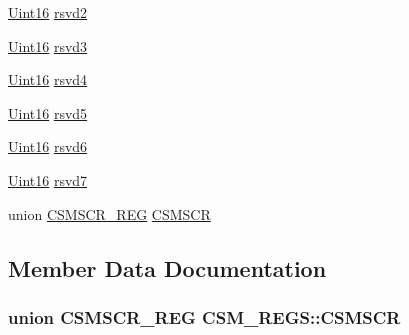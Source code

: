\begin{DoxyCompactItemize}
\item 
\hyperlink{_d_s_p2833x___device_8h_a59a9f6be4562c327cbfb4f7e8e18f08b}{Uint16} \hyperlink{struct_c_s_m___r_e_g_s_a8764b38dd3d522f0e91381302958eb78}{rsvd2}
\item 
\hyperlink{_d_s_p2833x___device_8h_a59a9f6be4562c327cbfb4f7e8e18f08b}{Uint16} \hyperlink{struct_c_s_m___r_e_g_s_a99e02d181935057376511671542dd61c}{rsvd3}
\item 
\hyperlink{_d_s_p2833x___device_8h_a59a9f6be4562c327cbfb4f7e8e18f08b}{Uint16} \hyperlink{struct_c_s_m___r_e_g_s_aae4e714538d044e01433943510615c54}{rsvd4}
\item 
\hyperlink{_d_s_p2833x___device_8h_a59a9f6be4562c327cbfb4f7e8e18f08b}{Uint16} \hyperlink{struct_c_s_m___r_e_g_s_adb1133c4a93f1b9e2dceda2b3dcf83a5}{rsvd5}
\item 
\hyperlink{_d_s_p2833x___device_8h_a59a9f6be4562c327cbfb4f7e8e18f08b}{Uint16} \hyperlink{struct_c_s_m___r_e_g_s_ae58303f1818d0833e2050b37be5f84f8}{rsvd6}
\item 
\hyperlink{_d_s_p2833x___device_8h_a59a9f6be4562c327cbfb4f7e8e18f08b}{Uint16} \hyperlink{struct_c_s_m___r_e_g_s_a2aa082d9f598ea9e0a93de9af6498c06}{rsvd7}
\item 
union \hyperlink{union_c_s_m_s_c_r___r_e_g}{C\+S\+M\+S\+C\+R\+\_\+\+R\+E\+G} \hyperlink{struct_c_s_m___r_e_g_s_ac8f9409f438f898359135dcec87670f8}{C\+S\+M\+S\+C\+R}
\end{DoxyCompactItemize}


\subsection{Member Data Documentation}
\hypertarget{struct_c_s_m___r_e_g_s_ac8f9409f438f898359135dcec87670f8}{}
\subsubsection[{C\+S\+M\+S\+C\+R}]{\setlength{\rightskip}{0pt plus 5cm}union {\bf C\+S\+M\+S\+C\+R\+\_\+\+R\+E\+G} C\+S\+M\+\_\+\+R\+E\+G\+S\+::\+C\+S\+M\+S\+C\+R}\label{struct_c_s_m___r_e_g_s_ac8f9409f438f898359135dcec87670f8}
\hypertarget{struct_c_s_m___r_e_g_s_a7e06a87597063e7639e0d9594b64a815}{}
